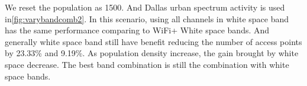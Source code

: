 We reset the population as 1500. And Dallas urban spectrum activity is used in\ref{fig:varybandcomb2}.
In this scenario, using all channels in white space band has the same performance comparing to WiFi+
White space bands. And generally white space band still have benefit reducing the number of access points
by 23.33\% and 9.19\%. As population density increase, the gain brought by white space decrease. The best
band combination is still the combination with white space bands.



